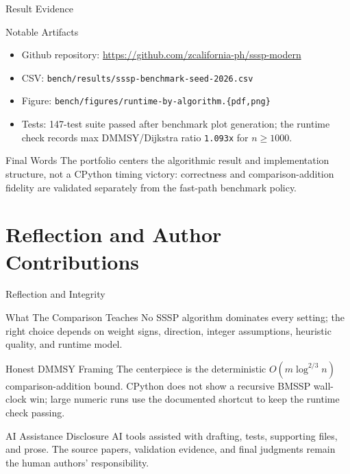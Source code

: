\documentclass[aspectratio=169]{beamer}
\begin{document}
\begin{frame}{Result Evidence}
  \footnotesize
  \begin{block}{Notable Artifacts}
    \begin{itemize}
      \item Github repository: \url{https://github.com/zcalifornia-ph/sssp-modern}
      \item CSV: \texttt{bench/results/sssp-benchmark-seed-2026.csv}
      \item Figure: \texttt{bench/figures/runtime-by-algorithm.\{pdf,png\}}
      \item Tests: 147-test suite passed after benchmark plot generation; the runtime check records max DMMSY/Dijkstra ratio \texttt{1.093x} for $n \ge 1000$.
    \end{itemize}
  \end{block}

  \begin{alertblock}{Final Words}
    The portfolio centers the algorithmic result and implementation structure,
    not a CPython timing victory: correctness and comparison-addition fidelity
    are validated separately from the fast-path benchmark policy.
  \end{alertblock}
\end{frame}

\section{Reflection and Author Contributions}

\begin{frame}{Reflection and Integrity}
  \small
  \begin{block}{What The Comparison Teaches}
    No SSSP algorithm dominates every setting; the right choice depends on
    weight signs, direction, integer assumptions, heuristic quality, and runtime model.
  \end{block}

  \begin{alertblock}{Honest DMMSY Framing}
    The centerpiece is the deterministic $O(m \log^{2/3} n)$ comparison-addition
    bound. CPython does not show a recursive BMSSP wall-clock win; large numeric
    runs use the documented shortcut to keep the runtime check passing.
  \end{alertblock}

  \begin{exampleblock}{AI Assistance Disclosure}
    AI tools assisted with drafting, tests, supporting files, and prose. The source
    papers, validation evidence, and final judgments remain the human authors'
    responsibility.
  \end{exampleblock}
\end{frame}
\end{document}
